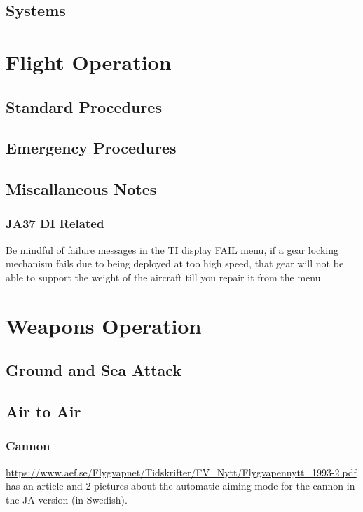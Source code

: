 \chapter{Systems}

\part{Flight Operation}
\chapter{Standard Procedures}
\chapter{Emergency Procedures}
\chapter{Miscallaneous Notes}
\section{JA37 DI Related}
Be mindful of failure messages in the TI display FAIL menu, if a gear locking mechanism fails due to being deployed at too high speed, that gear will not be able to support the weight of the aircraft till you repair it from the menu.

\part{Weapons Operation}
\chapter{Ground and Sea Attack}
\chapter{Air to Air}
\section{Cannon}
\url{https://www.aef.se/Flygvapnet/Tidskrifter/FV_Nytt/Flygvapennytt_1993-2.pdf} has an article and 2 pictures about the automatic aiming mode for the cannon in the JA version (in Swedish).

